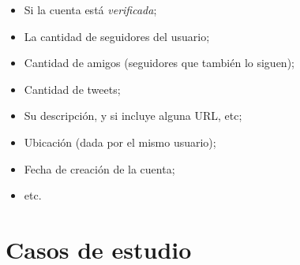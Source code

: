 \documentclass[upright, contnum]{umemoria}
\begin{document}
\begin{itemize}
\item Si la cuenta está \emph{verificada};
\item La cantidad de seguidores del usuario;
\item Cantidad de amigos (seguidores que también lo siguen);
\item Cantidad de tweets;
\item Su descripción, y si incluye alguna URL, etc;
\item Ubicación (dada por el mismo usuario);
\item Fecha de creación de la cuenta;
\item etc.
\end{itemize}
\section{Casos de estudio}
\label{sec-1.4}
\end{document}
